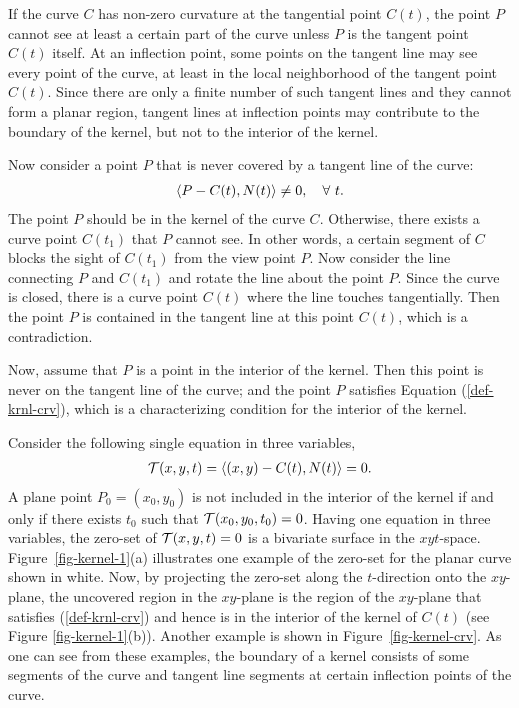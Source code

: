 \documentclass[doublespacing]{elsart}
\begin{document}
If the curve $C$ has non-zero curvature at the tangential point $C(t)$,
the point $P$ cannot see at least a certain part of the curve
unless $P$ is the tangent point $C(t)$ itself.
At an inflection point, some points on the tangent line may see
every point of the curve, at least in the local neighborhood of
the tangent point $C(t)$.  Since there are only a finite number of
such tangent lines and they cannot form a planar region,
tangent lines at inflection points may contribute to
the boundary of the kernel, but not to the interior of the kernel.

Now consider a point $P$ that is never covered by a tangent line
of the curve:
\begin{eqnarray}
\inner{P - C(t)}{N(t)} \neq 0,\quad \forall\ t.
\label{def-krnl-crv}
\end{eqnarray}
The point $P$ should be in the kernel of the curve $C$.
Otherwise, there exists a curve point $C(t_1)$ that $P$ cannot see.
In other words, a certain segment of $C$ blocks the sight of $C(t_1)$
from the view point $P$.  Now consider the line connecting $P$ and
$C(t_1)$ and rotate the line about the point $P$.  Since the curve
is closed, there is a curve point $C(t)$ where the line touches
tangentially.  Then the point $P$ is contained in the tangent line
at this point $C(t)$, which is a contradiction.

Now, assume that $P$ is a point in the interior of the kernel.
Then this point is never on the tangent line of the curve; and
the point $P$ satisfies Equation (\ref{def-krnl-crv}),
which is a characterizing condition for the interior of the kernel.
 
Consider the following single equation in three variables, 
\begin{eqnarray}
{\cal T}(x, y, t) = \inner{(x, y) - C(t)}{N(t)} = 0. \label{eqn-kernel-crv}
\end{eqnarray}
A plane point $P_0 = (x_0, y_0)$ is not included in the interior of
the kernel if and only if there exists
$t_0$ such that ${\cal T}(x_0, y_0, t_0) = 0$. Having one equation in 
three variables, the zero-set of ${\cal T}(x, y, t) = 0$ is a bivariate 
surface in the $xyt$-space. 
Figure~\ref{fig-kernel-1}(a) illustrates one example of the zero-set for the 
planar curve shown in white.  Now, by projecting the zero-set along
the $t$-direction onto the $xy$-plane, the uncovered region in the $xy$-plane 
is the region of the $xy$-plane that satisfies (\ref{def-krnl-crv})
and hence is in the interior of the kernel of $C(t)$
(see Figure \ref{fig-kernel-1}(b)).
Another example is shown in Figure~\ref{fig-kernel-crv}.
As one can see from these examples, the boundary of a kernel consists
of some segments of the curve and tangent line segments
at certain inflection points of the curve.
\end{document}
